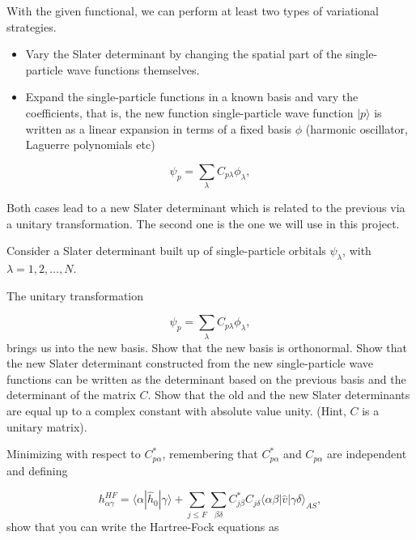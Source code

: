 \documentclass[%
oneside,                 %
final,                   %
10pt]{article}
\begin{document}
With the given functional, we can perform at least two types of variational strategies.

\begin{itemize}
  \item Vary the Slater determinant by changing the spatial part of the single-particle wave functions themselves.

  \item Expand the single-particle functions in a known basis  and vary the coefficients,  that is, the new function single-particle wave function $|p\rangle$ is written as a linear expansion in terms of a fixed basis $\phi$ (harmonic oscillator, Laguerre polynomials etc)  
\end{itemize}

\noindent
\begin{equation*} 
\psi_p  = \sum_{\lambda} C_{p\lambda}\phi_{\lambda},
\end{equation*}

Both cases lead to a new Slater determinant which is related to the previous via  a unitary transformation.
The second one is the one we will use in this project.


Consider a Slater determinant built up of single-particle orbitals 
$\psi_{\lambda}$,  with $\lambda = 1,2,\dots,N$.

The unitary transformation

\begin{equation*}
\psi_p  = \sum_{\lambda} C_{p\lambda}\phi_{\lambda},
\end{equation*}
brings us into the new basis.  Show that the new basis is orthonormal.
Show that the new Slater determinant constructed from the new single-particle wave functions can be
written as the determinant based on the previous basis and the determinant of the matrix $C$.
Show that the old and the new Slater determinants are equal up to a complex constant with absolute value unity.
(Hint, $C$ is a unitary matrix). 



Minimizing with respect to $C^*_{p\alpha}$, remembering that $C^*_{p\alpha}$ and $C_{p\alpha}$
are independent and defining

\begin{equation*}
h_{\alpha\gamma}^{HF}=\langle \alpha | \hat{h}_0 | \gamma \rangle+
\sum_{j\le F}\sum_{\beta\delta} C^*_{j\beta}C_{j\delta}\langle \alpha\beta|\hat{v}|\gamma\delta\rangle_{AS},
\end{equation*}
show that you can write the Hartree-Fock  equations as
\end{document}
